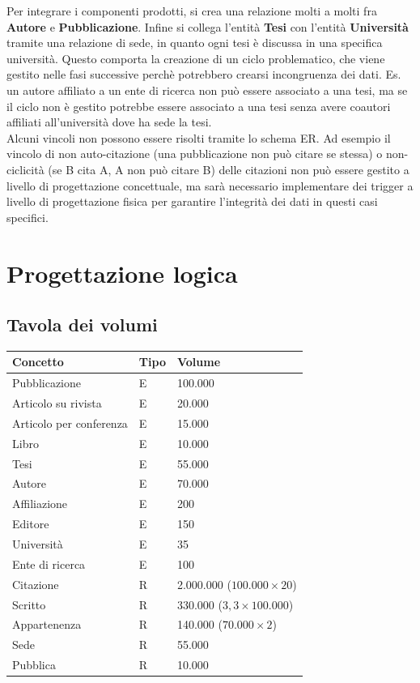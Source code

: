 \documentclass[a4paper,12pt]{article}
\begin{document}
Per integrare i componenti prodotti, si crea una relazione molti a molti fra \textbf{Autore} e \textbf{Pubblicazione}. Infine si collega l'entità \textbf{Tesi} con l'entità \textbf{Università} tramite una relazione di sede, in quanto ogni tesi è discussa in una specifica università. Questo comporta la creazione di un ciclo problematico, che viene gestito nelle fasi successive perchè potrebbero crearsi incongruenza dei dati. Es. un autore affiliato a un ente di ricerca non può essere associato a una tesi, ma se il ciclo non è gestito potrebbe essere associato a una tesi senza avere coautori affiliati all'università dove ha sede la tesi.
\\ Alcuni vincoli non possono essere risolti tramite lo schema ER. Ad esempio il vincolo di non auto-citazione (una pubblicazione non può citare se stessa) o non-ciclicità (se B cita A, A non può citare B) delle citazioni non può essere gestito a livello di progettazione concettuale, ma sarà necessario implementare dei trigger a livello di progettazione fisica per garantire l'integrità dei dati in questi casi specifici.
\section{Progettazione logica} \label{sec:progettazione-logica}
\subsection{Tavola dei volumi} \label{subsec:tavola-volumi}

\begin{tabularx}{\textwidth}{X X X}
\toprule
\textbf{Concetto} & \textbf{Tipo} & \textbf{Volume} \\
\midrule
Pubblicazione & E & 100.000 \\
Articolo su rivista & E & 20.000 \\
Articolo per conferenza & E & 15.000 \\
Libro & E & 10.000 \\
Tesi & E & 55.000 \\
Autore & E & 70.000 \\
Affiliazione & E & 200 \\
Editore & E & 150 \\
Università & E & 35 \\
Ente di ricerca & E & 100 \\
\midrule
Citazione & R & 2.000.000 ($100.000 \times 20$) \\
Scritto & R & 330.000 ($3,3 \times 100.000$) \\
Appartenenza & R & 140.000 ($70.000 \times 2$) \\
Sede & R & 55.000 \\
Pubblica & R & 10.000 \\
\bottomrule
\end{tabularx}
\end{document}
